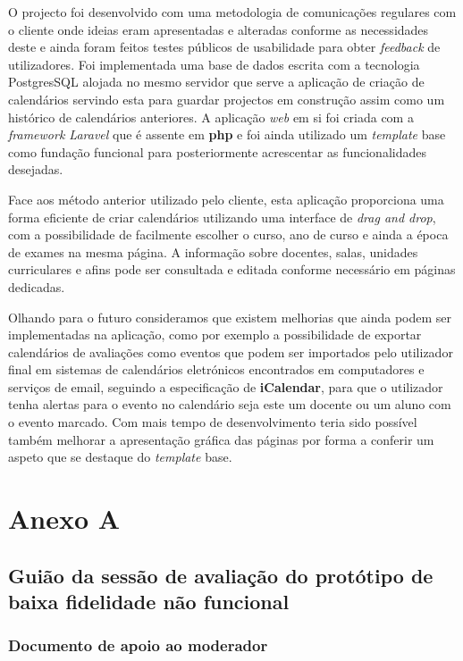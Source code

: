 \documentclass[11pt, twoside]{report}
\begin{document}
	O projecto foi desenvolvido com uma metodologia de comunicações regulares com o cliente onde ideias eram apresentadas e alteradas conforme as necessidades deste e ainda foram feitos testes públicos de usabilidade para obter \textit{feedback} de utilizadores.
	Foi implementada uma base de dados escrita com a tecnologia PostgresSQL alojada no mesmo servidor que serve a aplicação de criação de calendários servindo esta para guardar projectos em construção assim como um histórico de calendários anteriores.
	A aplicação \textit{web} em si foi criada com a \textit{framework Laravel} que é assente em \textbf{php} e foi ainda utilizado um \textit{template} base como fundação funcional para posteriormente acrescentar as funcionalidades desejadas.
	
	Face aos método anterior utilizado pelo cliente, esta aplicação proporciona uma forma eficiente de criar calendários utilizando uma interface de \textit{drag and drop}, com a possibilidade de facilmente escolher o curso, ano de curso e ainda a época de exames na mesma página.
	A informação sobre docentes, salas, unidades curriculares e afins pode ser consultada e editada conforme necessário em páginas dedicadas.
	
	Olhando para o futuro consideramos que existem melhorias que ainda podem ser implementadas na aplicação, como por exemplo a possibilidade de exportar calendários de avaliações como eventos que podem ser importados pelo utilizador final em sistemas de calendários eletrónicos encontrados em computadores e serviços de email, seguindo a especificação de \textbf{iCalendar}, para que o utilizador tenha alertas para o evento no calendário seja este um docente ou um aluno com o evento marcado.
	Com mais tempo de desenvolvimento teria sido possível também melhorar a apresentação gráfica das páginas por forma a conferir um aspeto que se destaque do \textit{template} base.
	
	
	
	
	\pagestyle{empty}
	
	\chapter*{Anexo A}
		\section*{Guião da sessão de avaliação do protótipo de baixa fidelidade não funcional}
		\subsection*{Documento de apoio ao moderador}
			
\end{document}
